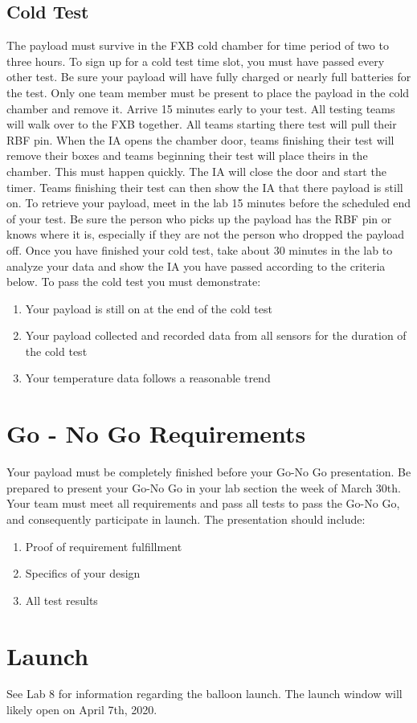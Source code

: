 \documentclass[12pt]{article}
\begin{document}
    \subsection*{Cold Test}
    The payload must survive in the FXB cold chamber for time period of two to three hours.
    \newline \newline
    To sign up for a cold test time slot, you must have passed every other test. Be sure your payload will have fully charged or nearly full batteries for the test. Only one team member must be present to place the payload in the cold chamber and remove it. Arrive 15 minutes early to your test. All testing teams will walk over to the FXB together. All teams starting there test will pull their RBF pin. When the IA opens the chamber door, teams finishing their test will remove their boxes and teams beginning their test will place theirs in the chamber. This must happen quickly. The IA will close the door and start the timer. Teams finishing their test can then show the IA that there payload is still on. To retrieve your payload, meet in the lab 15 minutes before the scheduled end of your test. Be sure the person who picks up the payload has the RBF pin or knows where it is, especially if they are not the person who dropped the payload off. Once you have finished your cold test, take about 30 minutes in the lab to analyze your data and show the IA you have passed according to the criteria below.
    \newline \newline
    To pass the cold test you must demonstrate:
    \begin{enumerate}
        \item Your payload is still on at the end of the cold test
        \item Your payload collected and recorded data from all sensors for the duration of the cold test
        \item Your temperature data follows a reasonable trend
    \end{enumerate}
    
    \section*{Go - No Go Requirements}
    Your payload must be completely finished before your Go-No Go presentation. Be prepared to present your Go-No Go in your lab section the week of March 30th. Your team must meet all requirements and pass all tests to pass the Go-No Go, and consequently participate in launch. The presentation should include:
    \begin{enumerate}
        \item Proof of requirement fulfillment
        \item Specifics of your design
        \item All test results
    \end{enumerate}
    
    \section*{Launch}
    See Lab 8 for information regarding the balloon launch. The launch window will likely open on April 7th, 2020.
    
\end{document}
